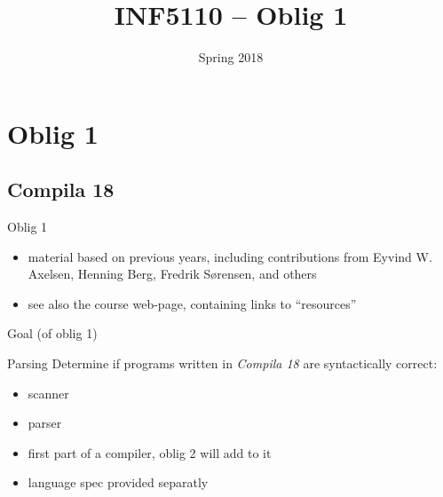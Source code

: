 \documentclass{beamer}
\date{Spring 2018}
\title{INF5110 -- Oblig 1}
\renewcommand{\maketitle}{}
\begin{document}
\maketitle
\chapter{Oblig 1}
\label{sec:orgf66caac}



\section{Compila 18}
\label{sec:orgccdff3d}

\begin{frame}[label={sec:org8d65338}]{Oblig 1}
\begin{itemize}
\item material based on previous years, including contributions from Eyvind
W. Axelsen, Henning Berg, Fredrik Sørensen, and others
\end{itemize}


\begin{itemize}
\item see also the course web-page, containing links to ``resources''
\end{itemize}
\end{frame}


\begin{frame}[label={sec:org773ea86}]{Goal (of oblig 1)}
\begin{block}{Parsing}
Determine if programs written in \emph{Compila 18} are syntactically correct: 

\begin{itemize}
\item scanner
\item parser
\end{itemize}
\end{block}


\begin{itemize}
\item first part of a compiler, oblig 2 will add to it
\item language spec provided separatly
\end{itemize}
\end{frame}
\end{document}
